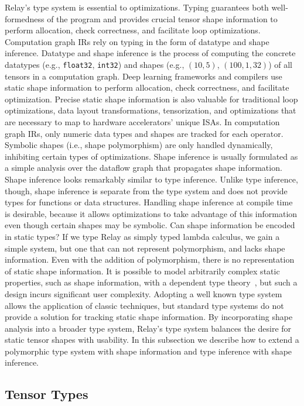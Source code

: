 Relay's type system is essential
  to optimizations.
Typing guarantees both well-formedness of the program
  and provides crucial tensor shape information to perform allocation,
  check correctness, and facilitate loop optimizations.
Computation graph IRs rely on typing in the form of
  datatype and shape inference.
Datatype and shape inference is the process of computing the
  concrete datatypes (e.g., \verb|float32|, \verb|int32|) and shapes (e.g., $(10, 5)$, $(100, 1, 32)$) of all
  tensors in a computation graph.
Deep learning frameworks and compilers use static shape information
  to perform allocation, check correctness, and facilitate optimization.
Precise static shape information is also valuable for traditional loop
  optimizations, data layout transformations, tensorization, and
  optimizations that are necessary to map to hardware accelerators' unique ISAs.
In computation graph IRs, only numeric data types
  and shapes are tracked for each operator.
Symbolic shapes (i.e., shape polymorphism) are only handled
  dynamically, inhibiting certain types of optimizations.
Shape inference is usually formulated as a simple analysis over the dataflow graph that
  propagates shape information.
Shape inference looks remarkably similar to type inference.
Unlike type inference, though, shape inference is separate from the type system and
  does not provide types for functions or data structures.
Handling shape inference at compile time is desirable, because it allows optimizations to take
  advantage of this information even though certain shapes may be symbolic. Can shape information be encoded in static types?
If we type Relay as simply typed lambda calculus,
  we gain a simple system, but one that can not represent polymorphism,
  and lacks shape information.
Even with the addition of polymorphism, there is no representation of static
  shape information.
  It is possible to model arbitrarily complex static properties, such
  as shape information, with a dependent type theory~\citep{selsam_certigrad}, but such
  a design incurs significant user complexity.
Adopting a well known type system allows the application of
  classic techniques, but standard type systems do not
  provide a solution for tracking static shape information.
By incorporating shape analysis into a broader type system,
  Relay's type system balances the desire for static tensor shapes
  with usability.
In this subsection we describe how to extend a polymorphic type system with shape
  information and type inference with shape inference.

\subsection{Tensor Types}

